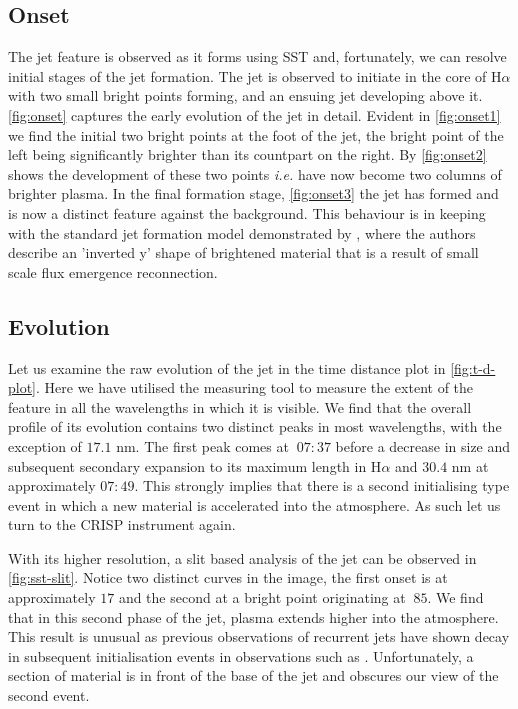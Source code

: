 \subsection{Onset}
The jet feature is observed as it forms using SST and, fortunately, we can resolve initial stages of the jet formation.
The jet is observed to initiate in the core of H$\alpha$ with two small bright points forming, and an ensuing jet developing above it. 
\cref{fig:onset} captures the early evolution of the jet in detail.
Evident in \cref{fig:onset1} we find the initial two bright points at the foot of the jet, the bright point of the left being significantly brighter than its countpart on the right.
By \cref{fig:onset2} shows the development of these two points \emph{i.e.} have now become two columns of brighter plasma.
In the final formation stage, \cref{fig:onset3} the jet has formed and is now a distinct feature against the background.
This behaviour is in keeping with the standard jet formation model demonstrated by \cite{Shibata1992}, where the authors describe an 'inverted y' shape of brightened material that is a result of small scale flux emergence reconnection.



\subsection{Evolution}
Let us examine the raw evolution of the jet in the time distance plot in \cref{fig:t-d-plot}.
Here we have utilised the measuring tool to measure the extent of the feature in all the wavelengths in which it is visible.
We find that the overall profile of its evolution contains two distinct peaks in most wavelengths, with the exception of $17.1$ nm.
The first peak comes at $~07:37$ before a decrease in size and subsequent secondary expansion to its maximum length in H$\alpha$ and $30.4$ nm at approximately $07:49$.
This strongly implies that there is a second initialising type event in which a new material is accelerated into the atmosphere.
As such let us turn to the CRISP instrument again.

With its higher resolution, a slit based analysis of the jet can be observed in \cref{fig:sst-slit}.
Notice two distinct curves in the image, the first onset is at approximately $17$ and the second at a bright point originating at $~85$.
We find that in this second phase of the jet, plasma extends higher into the atmosphere.
This result is unusual as previous observations of recurrent jets have shown decay in subsequent initialisation events in observations such as \cite{Jiang2007}.
Unfortunately, a section of material is in front of the base of the jet and obscures our view of the second event.

